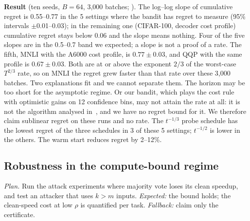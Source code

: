 \textbf{Result} (ten seeds, $B=64$, 3{,}000 batches; ). The log--log
slope of cumulative regret is 0.55--0.77 in the 5 settings where the bandit has regret to measure (95\% intervals
$\pm$0.01--0.03); in the remaining one (CIFAR-100, decoder cost profile) cumulative regret stays below 0.06 and the
slope means nothing. Four of the five slopes are in the 0.5--0.7 band we expected; a slope is not a proof of a rate.
The fifth, MNLI with the A6000 cost profile, is $0.77\pm0.03$, and QQP with the same profile is $0.67\pm0.03$. Both
are at or above the exponent $2/3$ of the worst-case $T^{2/3}$ rate, so on MNLI the regret grew faster than that rate
over these 3{,}000 batches. Two explanations fit and we cannot separate them. The horizon may be too short for the
asymptotic regime. Or our bandit, which plays the cost rule with optimistic gains on 12 confidence bins, may not
attain the rate at all: it is not the algorithm analysed in~\cite{labeleff}, and we have no regret bound for it. We
therefore claim sublinear regret on these runs and no rate. The $t^{-1/3}$ probe schedule has the lowest regret of
the three schedules in 3 of these 5 settings; $t^{-1/2}$ is lower in the others. The warm start reduces regret by
2--12\%.

\subsection{Robustness in the compute-bound regime}\label{sec:robust5}
\textit{Plan.} Run the attack experiments where majority vote loses its clean speedup, and test an attacker that
uses $k>m$ inputs. \textit{Expected:} the bound holds; the clean-speed cost at low $\rho$ is quantified per task.
\textit{Fallback:} claim only the certificate.

